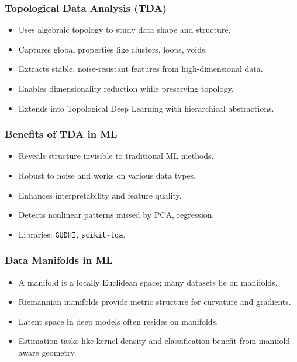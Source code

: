 \begin{frame}[fragile]\frametitle{Topological Data Analysis (TDA)}
  \begin{itemize}
    \item Uses algebraic topology to study data shape and structure.
    \item Captures global properties like clusters, loops, voids.
    \item Extracts stable, noise-resistant features from high-dimensional data.
    \item Enables dimensionality reduction while preserving topology.
    \item Extends into Topological Deep Learning with hierarchical abstractions.
  \end{itemize}
\end{frame}

\begin{frame}[fragile]\frametitle{Benefits of TDA in ML}
  \begin{itemize}
    \item Reveals structure invisible to traditional ML methods.
    \item Robust to noise and works on various data types.
    \item Enhances interpretability and feature quality.
    \item Detects nonlinear patterns missed by PCA, regression.
    \item Libraries: \texttt{GUDHI}, \texttt{scikit-tda}.
  \end{itemize}
\end{frame}

\begin{frame}[fragile]\frametitle{Data Manifolds in ML}
  \begin{itemize}
    \item A manifold is a locally Euclidean space; many datasets lie on manifolds.
    \item Riemannian manifolds provide metric structure for curvature and gradients.
    \item Latent space in deep models often resides on manifolds.
    \item Estimation tasks like kernel density and classification benefit from manifold-aware geometry.
  \end{itemize}
\end{frame}

